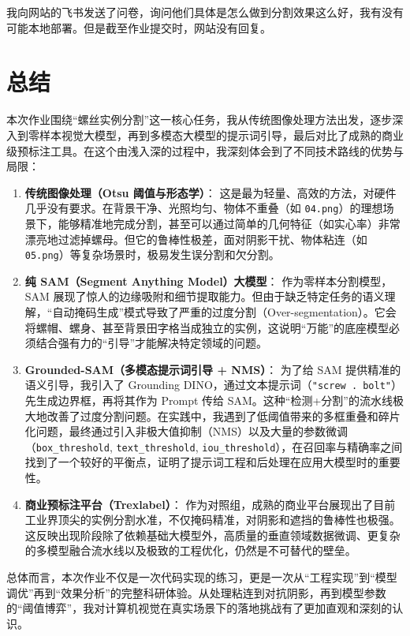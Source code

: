 \documentclass[12pt,a4paper]{ctexart}
\begin{document}
我向网站的飞书发送了问卷，询问他们具体是怎么做到分割效果这么好，我有没有可能本地部署。但是截至作业提交时，网站没有回复。

\section{总结}
本次作业围绕“螺丝实例分割”这一核心任务，我从传统图像处理方法出发，逐步深入到零样本视觉大模型，再到多模态大模型的提示词引导，最后对比了成熟的商业级预标注工具。在这个由浅入深的过程中，我深刻体会到了不同技术路线的优势与局限：

\begin{enumerate}
    \item \textbf{传统图像处理（Otsu 阈值与形态学）}：
    这是最为轻量、高效的方法，对硬件几乎没有要求。在背景干净、光照均匀、物体不重叠（如 \texttt{04.png}）的理想场景下，能够精准地完成分割，甚至可以通过简单的几何特征（如实心率）非常漂亮地过滤掉螺母。但它的鲁棒性极差，面对阴影干扰、物体粘连（如 \texttt{05.png}）等复杂场景时，极易发生误分割和欠分割。

    \item \textbf{纯 SAM（Segment Anything Model）大模型}：
    作为零样本分割模型，SAM 展现了惊人的边缘吸附和细节提取能力。但由于缺乏特定任务的语义理解，“自动掩码生成”模式导致了严重的过度分割（Over-segmentation）。它会将螺帽、螺身、甚至背景田字格当成独立的实例，这说明“万能”的底座模型必须结合强有力的“引导”才能解决特定领域的问题。

    \item \textbf{Grounded-SAM（多模态提示词引导 + NMS）}：
    为了给 SAM 提供精准的语义引导，我引入了 Grounding DINO，通过文本提示词（\texttt{"screw . bolt"}）先生成边界框，再将其作为 Prompt 传给 SAM。这种“检测+分割”的流水线极大地改善了过度分割问题。在实践中，我遇到了低阈值带来的多框重叠和碎片化问题，最终通过引入非极大值抑制（NMS）以及大量的参数微调（\texttt{box\_threshold}, \texttt{text\_threshold}, \texttt{iou\_threshold}），在召回率与精确率之间找到了一个较好的平衡点，证明了提示词工程和后处理在应用大模型时的重要性。

    \item \textbf{商业预标注平台（Trexlabel）}：
    作为对照组，成熟的商业平台展现出了目前工业界顶尖的实例分割水准，不仅掩码精准，对阴影和遮挡的鲁棒性也极强。这反映出现阶段除了依赖基础大模型外，高质量的垂直领域数据微调、更复杂的多模型融合流水线以及极致的工程优化，仍然是不可替代的壁垒。
\end{enumerate}

总体而言，本次作业不仅是一次代码实现的练习，更是一次从“工程实现”到“模型调优”再到“效果分析”的完整科研体验。从处理粘连到对抗阴影，再到模型参数的“阈值博弈”，我对计算机视觉在真实场景下的落地挑战有了更加直观和深刻的认识。
\end{document}
